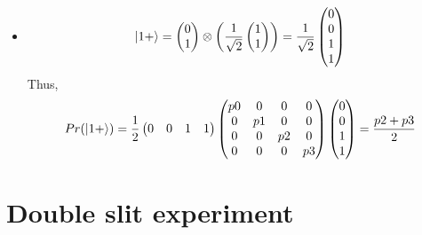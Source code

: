\documentclass[a4paper,10pt]{hw}
\DeclarePairedDelimiter\ket{\lvert}{\rangle}
\begin{document}
\begin{enumerate}
\begin{itemize}
	\item
	$$\ket{1+} = 
	\begin{pmatrix} 0 \\ 1 \end{pmatrix}
	\otimes \left(\frac{1}{\sqrt{2}} \begin{pmatrix} 1 \\ 1 \end{pmatrix}\right)
	=
	\frac{1}{\sqrt{2}} \begin{pmatrix} 0 \\ 0 \\ 1 \\ 1 \end{pmatrix}
	$$
	Thus,	
	$$
	Pr({\ket{1+}}) = \frac{1}{2} \begin{pmatrix} 0 & 0 & 1 & 1 \end{pmatrix}
	\begin{pmatrix}
	p0 & 0 & 0 & 0 \\
	0 & p1 & 0 & 0 \\
	0 & 0 & p2 & 0 \\
	0 & 0 & 0 & p3
	\end{pmatrix}
	\begin{pmatrix} 0 \\ 0 \\ 1 \\ 1 \end{pmatrix}
	=
	\frac{p2 + p3}{2}
	$$	
	
\end{itemize}

\end{enumerate}

\section{Double slit experiment}
\end{document}
